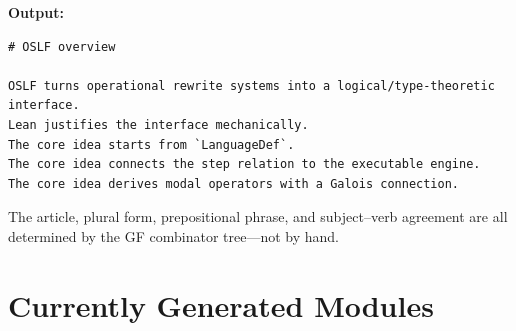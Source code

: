 \documentclass[11pt]{article}
\begin{document}
\medskip
\noindent\textbf{Output:}
\begin{lstlisting}[caption={Generated first paragraph of Mettapedia/OSLF/README.md}]
# OSLF overview

OSLF turns operational rewrite systems into a logical/type-theoretic interface.
Lean justifies the interface mechanically.
The core idea starts from `LanguageDef`.
The core idea connects the step relation to the executable engine.
The core idea derives modal operators with a Galois connection.
\end{lstlisting}

\noindent The article, plural form, prepositional phrase, and subject--verb agreement
are all determined by the GF combinator tree---not by hand.

\section{Currently Generated Modules}
\end{document}
